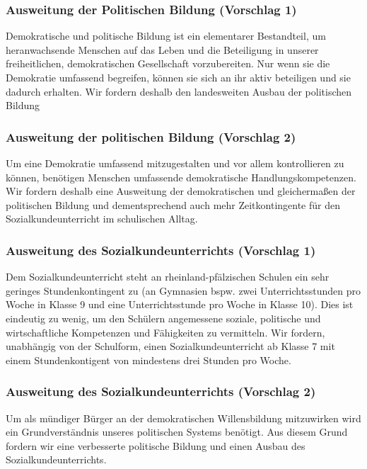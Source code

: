 
\subsubsection{Ausweitung der Politischen Bildung (Vorschlag 1)}
\abstimmung 
Demokratische und politische Bildung ist ein elementarer Bestandteil, um heranwachsende Menschen auf das Leben und die Beteiligung in unserer freiheitlichen, demokratischen Gesellschaft vorzubereiten. Nur wenn sie die Demokratie umfassend begreifen, können sie sich an ihr aktiv beteiligen und sie dadurch erhalten. Wir fordern deshalb den landesweiten Ausbau der politischen Bildung

\subsubsection{Ausweitung der politischen Bildung (Vorschlag 2)}
\abstimmung 
Um eine Demokratie umfassend mitzugestalten und vor allem kontrollieren zu können, benötigen Menschen umfassende demokratische Handlungskompetenzen. Wir fordern deshalb eine Ausweitung der demokratischen und gleichermaßen der politischen Bildung und dementsprechend auch mehr Zeitkontingente für den Sozialkundeunterricht im schulischen Alltag.

\subsubsection{Ausweitung des Sozialkundeunterrichts (Vorschlag 1)}
\abstimmung 
Dem Sozialkundeunterricht steht an rheinland-pfälzischen Schulen ein sehr geringes Stundenkontingent zu (an Gymnasien bspw. zwei Unterrichtsstunden pro Woche in Klasse 9 und eine Unterrichtsstunde pro Woche in Klasse 10). Dies ist eindeutig zu wenig, um den Schülern angemessene soziale, politische und wirtschaftliche Kompetenzen und Fähigkeiten zu vermitteln. Wir fordern, unabhängig von der Schulform, einen Sozialkundeunterricht ab Klasse 7 mit einem Stundenkontigent von mindestens drei Stunden pro Woche.

\subsubsection{Ausweitung des Sozialkundeunterrichts (Vorschlag 2)}
\abstimmung 
Um als mündiger Bürger an der demokratischen Willensbildung mitzuwirken wird ein Grundverständnis unseres politischen Systems benötigt. Aus diesem Grund fordern wir eine verbesserte politische Bildung und einen Ausbau des Sozialkundeunterrichts.
 
